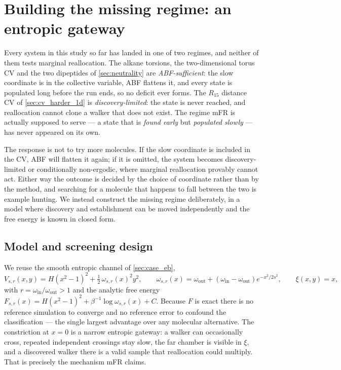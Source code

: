 \section{Building the missing regime: an entropic gateway}
\label{sec:gateway}

Every system in this study so far has landed in one of two regimes, and neither of them
tests marginal reallocation. The alkane torsions, the two-dimensional torus CV and the two
dipeptides of \cref{sec:neutrality} are \emph{ABF-sufficient}: the slow coordinate is in the
collective variable, ABF flattens it, and every state is populated long before the run ends,
so no deficit ever forms. The $R_{15}$ distance CV of \cref{sec:cv_harder_1d} is
\emph{discovery-limited}: the state is never reached, and reallocation cannot clone a walker
that does not exist. The regime mFR is actually supposed to serve --- a state that is
\emph{found early} but \emph{populated slowly} --- has never appeared on its own.

The response is not to try more molecules. If the slow coordinate is included in the CV,
ABF will flatten it again; if it is omitted, the system becomes discovery-limited or
conditionally non-ergodic, where marginal reallocation provably cannot act. Either way the
outcome is decided by the choice of coordinate rather than by the method, and searching for
a molecule that happens to fall between the two is example hunting. We instead construct the
missing regime deliberately, in a model where discovery and establishment can be moved
independently and the free energy is known in closed form.

\subsection{Model and screening design}
We reuse the smooth entropic channel of \cref{sec:case_eb},
\begin{equation}
  V_{s,r}(x,y) = H(x^2-1)^2 + \tfrac12\,\omega_{s,r}(x)^2 y^2,
  \qquad
  \omega_{s,r}(x) = \omega_{\mathrm{out}} + (\omega_{\mathrm{in}}-\omega_{\mathrm{out}})
                    e^{-x^2/2s^2},
  \qquad \xi(x,y) = x,
  \label{eq:gateway}
\end{equation}
with $r = \omega_{\mathrm{in}}/\omega_{\mathrm{out}} > 1$ and the analytic free energy
$F_{s,r}(x) = H(x^2-1)^2 + \beta^{-1}\log\omega_{s,r}(x) + C$. Because $F$ is exact there is
no reference simulation to converge and no reference error to confound the classification ---
the single largest advantage over any molecular alternative. The constriction at $x=0$ is a
narrow entropic gateway: a walker can occasionally cross, repeated independent crossings stay
slow, the far chamber is visible in $\xi$, and a discovered walker there is a valid sample
that reallocation could multiply. That is precisely the mechanism mFR claims.

